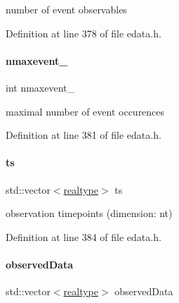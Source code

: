 number of event observables 

Definition at line 378 of file edata.\+h.

\mbox{\label{classamici_1_1_exp_data_af1bb7f9e32c45f8f3c34c9c4a7e5b1ac}} 
\paragraph{\texorpdfstring{nmaxevent\+\_\+}{nmaxevent\_}}
{\footnotesize\ttfamily int nmaxevent\+\_\+\hspace{0.3cm}{\ttfamily [protected]}}

maximal number of event occurences 

Definition at line 381 of file edata.\+h.

\mbox{\label{classamici_1_1_exp_data_aa7014a80e7b102f85a10e3b9a480e8e5}} 
\paragraph{\texorpdfstring{ts}{ts}}
{\footnotesize\ttfamily std\+::vector$<$\mbox{\hyperlink{namespaceamici_a1bdce28051d6a53868f7ccbf5f2c14a3}{realtype}}$>$ ts\hspace{0.3cm}{\ttfamily [protected]}}

observation timepoints (dimension\+: nt) 

Definition at line 384 of file edata.\+h.

\mbox{\label{classamici_1_1_exp_data_a6acedf749a3c5e4c4dcbc822f58a565d}} 
\paragraph{\texorpdfstring{observed\+Data}{observedData}}
{\footnotesize\ttfamily std\+::vector$<$\mbox{\hyperlink{namespaceamici_a1bdce28051d6a53868f7ccbf5f2c14a3}{realtype}}$>$ observed\+Data\hspace{0.3cm}{\ttfamily [protected]}}

